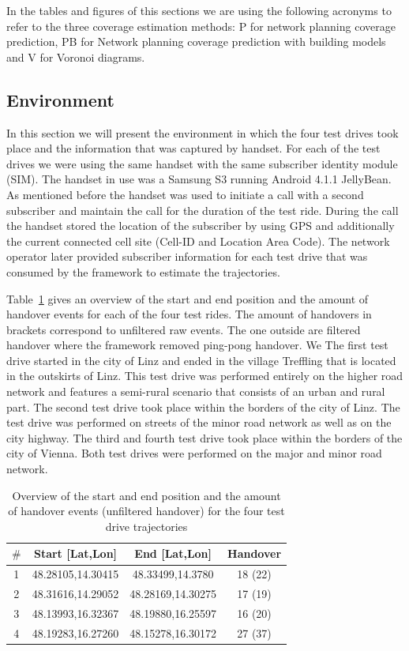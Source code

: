 In the tables and figures of this sections we are using the following acronyms to refer to the three coverage estimation methods: P for network planning coverage prediction, PB for Network planning coverage prediction with building models and V for Voronoi diagrams.
\subsection{Environment}
In this section we will present the environment in which the four test drives took place and the information that was captured by handset. For each of the test drives we were using the same handset with the same subscriber identity module (SIM). The handset in use was a Samsung S3 running Android 4.1.1 JellyBean. As mentioned before the handset was used to initiate a call with a second subscriber and maintain the call for the duration of the test ride. During the call the handset stored the location of the subscriber by using GPS and additionally the current connected cell site (Cell-ID and Location Area Code). The network operator later provided subscriber information for each test drive that was consumed by the framework to estimate the trajectories.

Table~\ref{table:tracks} gives an overview of the start and end position and the amount of handover events for each of the four test rides. The amount of handovers in brackets correspond to unfiltered raw events. The one outside are filtered handover where the framework removed ping-pong handover. We  The first test drive started in the city of Linz and ended in the village Treffling that is located in the outskirts of Linz. This test drive was performed entirely on the higher road network and features a semi-rural scenario that consists of an urban and rural part. The second test drive took place within the borders of the city of Linz. The test drive was performed on streets of the minor road network as well as on the city highway. The third and fourth test drive took place within the borders of the city of Vienna. Both test drives were performed on the major and minor road network.

	\begin{table}[h]
		\caption{Overview of the start and end position and the amount of handover events (unfiltered handover) for the four test drive trajectories}
		\begin{tabular}{|c|c|c|c|}
			\hline
			\textbf{$\#$} & \textbf{Start [Lat,Lon]} & \textbf{End [Lat,Lon]} & \textbf{Handover} \\ \hline
			1             & 48.28105,14.30415        & 48.33499,14.3780       & 18 (22)           \\ %
			2             & 48.31616,14.29052        & 48.28169,14.30275      & 17 (19)           \\  %
			3             & 48.13993,16.32367        & 48.19880,16.25597      & 16 (20)           \\ %
			4             & 48.19283,16.27260        & 48.15278,16.30172      & 27 (37)           \\  \hline %
		\end{tabular}
		\label{table:tracks}
	\end{table}

